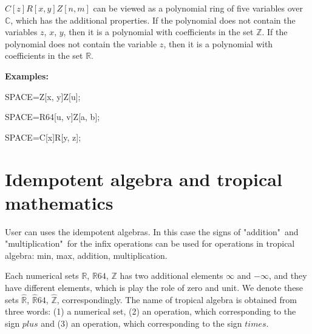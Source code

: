  
$C[z]R[x, y]Z[n, m]$  
  can be viewed as a polynomial ring of five variables over $\mathbb{C} $, which has the additional properties. 
If the polynomial does not contain the variables $ z $, $ x $, $ y $, then it is a polynomial with coefficients in the set $\mathbb {Z}$.
If the polynomial does not contain the variable $ z$, then it is a polynomial with coefficients in  the set $ \mathbb {R} $.

{\bf  Examples:} 

SPACE=Z[x, y]Z[u]; 

SPACE=R64[u, v]Z[a, b]; 

SPACE=C[x]R[y, z]; 









 
\section{Idempotent algebra and tropical mathematics}
User can uses the idempotent algebras.
In this case the signs of "addition"\ and "multiplication"\ for the infix operations can be used for operations in tropical algebra: min, max, addition, multiplication. 

Each numerical sets $\mathbb {R}$, $\mathbb {R}64$, $\mathbb {Z}$ has two additional elements $\infty$ and $-\infty$, and they have different 
elements, which is play the role of zero and unit. We  denote these sets $\hat {\mathbb {R}}$, $\hat {\mathbb {R}}64$, $\hat{\mathbb {Z}}$, correspondingly.
The name of tropical algebra is obtained from three words: (1) a numerical set, (2) an operation, which corresponding to the sign $plus$ 
and (3) an operation, which corresponding to the sign $times$.


